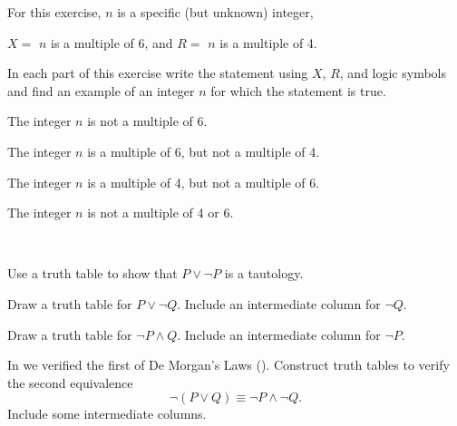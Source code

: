 \begin{exer}[\exerU] %
\label{exer_translate_into_and_or_with_not}
    For this exercise, $n$ is a specific (but unknown) integer,       
        \begin{center}
            $X=$ $n$ is a multiple of 6, and $R=$ $n$ is a multiple of 4.
        \end{center}  
    In each part of this exercise write the statement using $X$, $R$, and logic symbols and find an example of an integer $n$ for which the statement is true.
        \begin{exerpart}
            \item The integer $n$ is not a multiple of 6.
            \item The integer $n$ is a multiple of 6, but not a multiple of 4.
            \item The integer $n$ is a multiple of 4, but not a multiple of 6.   
            \item The integer $n$ is not a multiple of 4 or 6.               
        \end{exerpart}
\end{exer}

\begin{exer}[\exerP] %
\label{exer_truthtable_andornot}
~
    \begin{exerpart}
        \item Use a truth table to show that $P \lor \neg P$ is a tautology. 
        \item Draw a truth table for $P \lor \neg Q$.  Include an intermediate column for $\neg Q$. 
        \item Draw a truth table for $\neg P \land Q$.  Include an intermediate column for $\neg P$.  
    \end{exerpart}
\end{exer}

\begin{exer}[\exerU] %
\label{exer_truthtable_demorgan}
   In  we verified the first of De Morgan's Laws (). Construct truth tables to verify the second equivalence $$\neg(P \lor Q) \equiv \neg P \land \neg Q.$$  Include some intermediate columns. 
\end{exer} 

